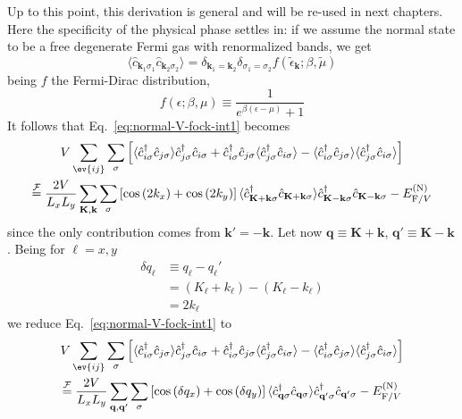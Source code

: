 Up to this point, this derivation is general and will be re-used in next chapters. Here the specificity of the physical phase settles in: if we assume the normal state to be a free degenerate Fermi gas with renormalized bands, we get
\[
	\langle \hat c_{\mathbf{k}_1\sigma_1} \hat c_{\mathbf{k}_2 \sigma_2} \rangle = \delta_{\mathbf{k}_1=\mathbf{k}_2} \delta_{\sigma_1=\sigma_2} f(\tilde{\epsilon}_\mathbf{k};\beta,\tilde{\mu})
\]
being $f$ the Fermi-Dirac distribution,
\[
	f(\epsilon;\beta,\mu) \equiv \frac{1}{e^{\beta(\epsilon-\mu)}+1}
\]
It follows that Eq.~\eqref{eq:normal-V-fock-int1} becomes
\begin{multline}
	V \sum_{\ev{ij}} \sum_\sigma \left[
	\langle
	\hat c_{i\sigma}^\dagger \hat c_{j\sigma}
	\rangle \hat c_{j\sigma}^\dagger  \hat c_{i\sigma} + 
	\hat c_{i\sigma}^\dagger \hat c_{j\sigma}
	\langle \hat c_{j\sigma}^\dagger  \hat c_{i\sigma} \rangle - \langle \hat c_{i\sigma}^\dagger \hat c_{j\sigma}
	\rangle \langle \hat c_{j\sigma}^\dagger  \hat c_{i\sigma} \rangle
	\right] \\
	\stackrel{\mathcal{F}}{=} \frac{2V}{L_x L_y} \sum_{\mathbf{K}, \mathbf{k}} \sum_\sigma \left[
	\cos \left(
	2 k_x
	\right)	+ \cos \left(
	2 k_y
	\right)	
	\right]	
	\langle
	\hat c_{\mathbf{K}+\mathbf{k} \sigma}^\dagger 
	\hat c_{\mathbf{K}+\mathbf{k} \sigma}
	\rangle
	\hat c_{\mathbf{K}-\mathbf{k} \sigma}^\dagger  \hat c_{\mathbf{K}-\mathbf{k}\sigma} - E_{\mathrm{F}/V}^{(\mathrm{N})} \label{eq:normal-V-fock-int2}
\end{multline}
since the only contribution comes from $\mathbf{k}'=-\mathbf{k}$. Let now $\mathbf{q}\equiv\mathbf{K}+\mathbf{k}$, $\mathbf{q}'\equiv\mathbf{K}-\mathbf{k}$. Being for $\ell=x,y$
\[
\begin{aligned}
	\delta q_\ell &\equiv q_\ell - q_\ell' \\
	&= (K_\ell+k_\ell) - (K_\ell-k_\ell) \\
	&= 2k_\ell
\end{aligned}
\]
we reduce Eq.~\eqref{eq:normal-V-fock-int1} to
\begin{multline}
	V \sum_{\ev{ij}} \sum_\sigma \left[
	\langle
	\hat c_{i\sigma}^\dagger \hat c_{j\sigma}
	\rangle \hat c_{j\sigma}^\dagger  \hat c_{i\sigma} + 
	\hat c_{i\sigma}^\dagger \hat c_{j\sigma}
	\langle \hat c_{j\sigma}^\dagger  \hat c_{i\sigma} \rangle - \langle \hat c_{i\sigma}^\dagger \hat c_{j\sigma}
	\rangle \langle \hat c_{j\sigma}^\dagger  \hat c_{i\sigma} \rangle
	\right] \\
	\stackrel{\mathcal{F}}{=} \frac{2V}{L_x L_y} \sum_{\mathbf{q}, \mathbf{q}'} \sum_\sigma \left[
		\cos \left(
			\delta q_x
		\right)	+ \cos \left(
			\delta q_y
		\right)	
	\right]	
	\langle
		\hat c_{\mathbf{q}\sigma}^\dagger 
		\hat c_{\mathbf{q}\sigma}
	\rangle
	\hat c_{\mathbf{q}'\sigma}^\dagger  \hat c_{\mathbf{q}'\sigma} - E_{\mathrm{F}/V}^{(\mathrm{N})} \label{eq:normal-V-fock-int3}
\end{multline}
